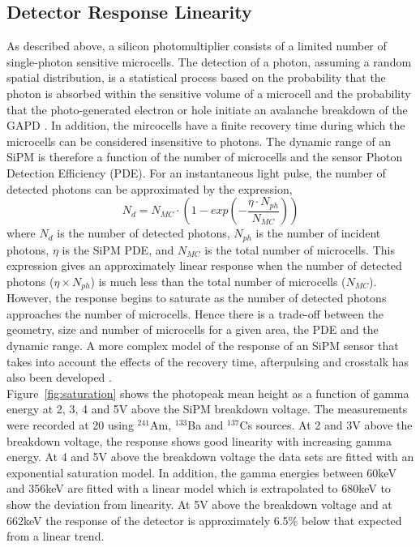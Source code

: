 \documentclass[journal]{IEEEtran}
\begin{document}
\subsection{Detector Response Linearity}
As described above, a silicon photomultiplier consists of a limited number of single-photon sensitive microcells. The detection of a photon, assuming a random spatial distribution, is a statistical process based on the probability that the photon is absorbed within the sensitive volume of a microcell and the probability that the photo-generated electron or hole initiate an avalanche breakdown of the GAPD \cite{geiger:mcintyre}. In addition, the mircocells have a finite recovery time during which the microcells can be considered insensitive to photons. The dynamic range of an SiPM is therefore a function of the number of microcells and the sensor Photon Detection Efficiency (PDE). For an instantaneous light pulse, the number of detected photons can be approximated by the expression,
\begin{equation} \label{first}
N_{d} = N_{MC}\cdot{}(1 - exp(-\frac{\eta{}\cdot{}N_{ph}}{N_{MC}}))
\end{equation}
where $N_{d}$ is the number of detected photons, $N_{ph}$ is the number of incident photons, $\eta$ is the SiPM PDE, and $N_{MC}$ is the total number of microcells. This expression gives an approximately linear response when the number of detected photons ($\eta{}\times{}N_{ph}$) is much less than the total number of microcells ($N_{MC}$). However, the response begins to saturate as the number of detected photons approaches the number of microcells. Hence there is a trade-off between the geometry, size and number of microcells for a given area, the PDE and the dynamic range. A more complex model of the response of an SiPM sensor that takes into account the effects of the recovery time, afterpulsing and crosstalk has also been developed \cite{model:dam}. \\

Figure~\ref{fig:saturation} shows the photopeak mean height as a function of gamma energy at 2, 3, 4 and 5V above the SiPM breakdown voltage. The measurements were recorded at 20\celsius{} using $^{241}$Am, $^{133}$Ba and $^{137}$Cs sources. At 2 and 3V above the breakdown voltage, the response shows good linearity with increasing gamma energy. At 4 and 5V above the breakdown voltage the data sets are fitted with an exponential saturation model. In addition, the gamma energies between 60keV and 356keV are fitted with a linear model which is extrapolated to 680keV to show the deviation from linearity. At 5V above the breakdown voltage and at 662keV the response of the detector is approximately 6.5\% below that expected from a linear trend. 
\end{document}
